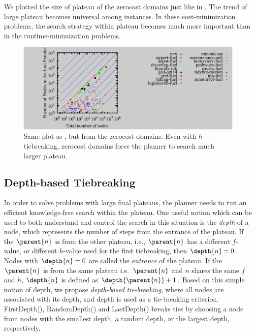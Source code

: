 We plotted the size of plateau of the zerocost domains just like in
. The trend of large plateau becomes universal among
instances. In these cost-minimization problems, the search strategy within
plateau becomes much more important than in the
runtime-minimization problems.

\begin{figure}[tb]
 \centering {}
  \includegraphics{tables/aaai16-frontier/zerocost/lmcut_frontier-front.pdf}
  \caption{Same plot as , but from the zerocost
  domains. Even with $h$-tiebreaking, zerocost domains force the planner
  to search much larger plateau.}
 \label{plateau-zerocost}
\end{figure}



\subsection{Depth-based Tiebreaking}

In order to solve problems with large final plateaus, the
planner needs to run an efficient knowledge-free search within the
plateau.  One useful notion which can be used to both understand and control the search in this
situation is the \emph{depth} of a node, which represents the number 
of steps from the entrance of the plateau.
If the $\parent{n}$ is from the other plateau, i.e., $\parent{n}$ has a
different $f$-value, or different $h$-value used for the first
tiebreaking, then $\depth{n} = 0$. Nodes with $\depth{n} = 0$ are called
the \emph{entrance} of the plateau.
If the $\parent{n}$ is from the same plateau i.e.\ $\parent{n}$ and $n$
shares the same $f$ and $h$,
$\depth{n}$ is defined as $\depth{\parent{n}} + 1$.
Based on this simple notion of depth,
we propose  \emph{depth-based tie-breaking}, where all nodes are associated with its depth, 
and depth is used as a tie-breaking criterion.
FirstDepth(\fd), RandomDepth(\rd) and LastDepth(\ld) breaks ties by choosing a node from 
nodes with the smallest depth, a random depth, or the largest depth, respectively.

